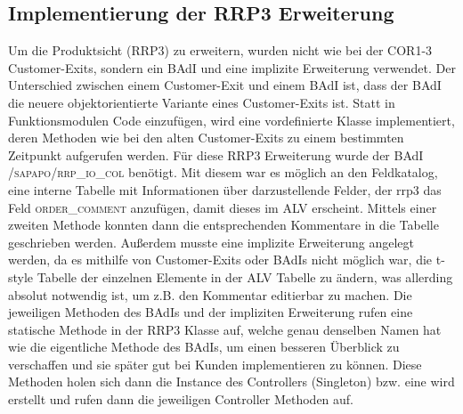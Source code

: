 \subsection{Implementierung der RRP3 Erweiterung}
\label{sec:Implementierung der RRP3 Erweiterung}   
Um die Produktsicht (RRP3) zu erweitern, wurden nicht wie bei der COR1-3 Customer-Exits, sondern ein \ac{BAdI} und eine implizite Erweiterung verwendet. Der Unterschied zwischen einem Customer-Exit und einem \ac{BAdI} ist, dass der \ac{BAdI} die neuere objektorientierte Variante eines Customer-Exits ist. Statt in Funktionsmodulen Code einzufügen, wird eine vordefinierte Klasse implementiert, deren Methoden wie bei den alten Customer-Exits zu einem bestimmten Zeitpunkt aufgerufen werden. Für diese RRP3 Erweiterung wurde der \ac{BAdI} \textsc{/sapapo/rrp\_io\_col} benötigt. Mit diesem war es möglich an den Feldkatalog, eine interne Tabelle mit Informationen über darzustellende Felder, der rrp3 das Feld \textsc{order\_comment} anzufügen, damit dieses im \ac{ALV} erscheint. Mittels einer zweiten Methode konnten dann die entsprechenden Kommentare in die Tabelle geschrieben werden. Außerdem musste eine implizite Erweiterung angelegt werden, da es mithilfe von Customer-Exits oder \ac{BAdI}s nicht möglich war, die t-style Tabelle der einzelnen Elemente in der \ac{ALV} Tabelle zu ändern, was allerding absolut notwendig ist, um z.B. den Kommentar editierbar zu machen. Die jeweiligen Methoden des \ac{BAdI}s und der impliziten Erweiterung rufen eine statische Methode in der RRP3 Klasse auf, welche genau denselben Namen hat wie die eigentliche Methode des \ac{BAdI}s, um einen besseren Überblick zu verschaffen und sie später gut bei Kunden implementieren zu können. Diese Methoden holen sich dann die Instance des Controllers (Singleton) bzw. eine wird erstellt und rufen dann die jeweiligen Controller Methoden auf.

